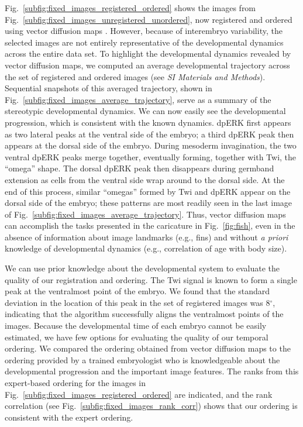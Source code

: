 \documentclass{pnastwo}
\newcommand{\SI}[0]{{\it SI Materials and Methods}}
\newcommand{\fig}[0]{Fig.}
\begin{document}
\begin{article}
\fig~\ref{subfig:fixed_images_registered_ordered} shows the images from \fig~\ref{subfig:fixed_images_unregistered_unordered}, now registered and ordered using vector diffusion maps \cite{singer2012vector}.
%
However, because of interembryo variability, the selected images are not entirely representative of the developmental dynamics across the entire data set.
%
To highlight the developmental dynamics revealed by vector diffusion maps, we computed an average developmental trajectory across the set of registered and ordered images (see \SI). 
%
Sequential snapshots of this averaged trajectory, shown in \fig~\ref{subfig:fixed_images_average_trajectory}, serve as a summary of the stereotypic developmental dynamics.
%
We can now easily see the developmental progression, which is consistent with the known dynamics. 
%
dpERK first appears as two lateral peaks at the ventral side of the embryo; a third dpERK peak then appears at the dorsal side of the embryo.
%
During mesoderm invagination, the two ventral dpERK peaks merge together, eventually forming, together with Twi, the ``omega'' shape.
%
The dorsal dpERK peak then disappears during germband extension as cells from the ventral side wrap around to the dorsal side.
%
At the end of this process, similar ``omegas'' formed by Twi and dpERK appear on the dorsal side of the embryo; these patterns are most readily seen in the last image of \fig~\ref{subfig:fixed_images_average_trajectory}.
%
Thus, vector diffusion maps can accomplish the tasks presented in the caricature in \fig~\ref{fig:fish}, even in the absence of information about image landmarks (e.g., fins) and without {\it a priori} knowledge of developmental dynamics (e.g., correlation of age with body size).

We can use prior knowledge about the developmental system to evaluate the quality of our registration and ordering. 
%
The Twi signal is known to form a single peak at the ventralmost point of the embryo. 
%
We found that the standard deviation in the location of this peak in the set of registered images was 8$^\circ$,
indicating that the algorithm successfully aligns the ventralmost points of the images. 
%
Because the developmental time of each embryo cannot be easily estimated, we have few options for evaluating the quality of our temporal ordering. 
%
We compared the ordering obtained from vector diffusion maps to the ordering provided by a trained embryologist who is knowledgeable about the developmental progression and the important image features.  
%
The ranks from this expert-based ordering for the images in \fig~\ref{subfig:fixed_images_registered_ordered} are indicated, and the rank correlation (see \fig~\ref{subfig:fixed_images_rank_corr}) shows that our ordering is consistent with the expert ordering. 


\end{article}
\end{document}
